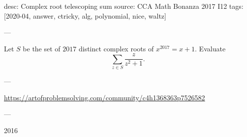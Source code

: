 desc: Complex root telescoping sum
source: CCA Math Bonanza 2017 I12
tags: [2020-04, answer, ctricky, alg, polynomial, nice, waltz]

---

Let $S$ be the set of $2017$ distinct complex roots of $x^{2017}=x+1$. Evaluate \[\sum_{z\in S}\frac z{z^2+1}.\]

---

\url{https://artofproblemsolving.com/community/c4h1368363p7526582}

---

2016
